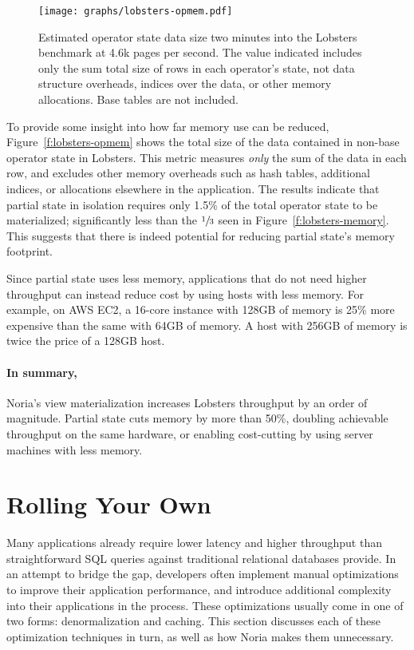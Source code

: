 \begin{figure}[h]
  \centering
  \texttt{[image: graphs/lobsters-opmem.pdf]}
  \caption{Estimated operator state data size two minutes into the Lobsters
  benchmark at 4.6k pages per second. The value indicated includes only the sum
  total size of rows in each operator's state, not data structure overheads,
  indices over the data, or other memory allocations. Base tables are not
  included.}
  \label{f:lobsters-opmem}
\end{figure}

To provide some insight into how far memory use can be reduced,
Figure~\vref{f:lobsters-opmem} shows the total size of the data contained in
non-base operator state in Lobsters. This metric measures \emph{only} the sum of
the data in each row, and excludes other memory overheads such as hash tables,
additional indices, or allocations elsewhere in the application. The results
indicate that partial state in isolation requires only 1.5\% of the total
operator state to be materialized; significantly less than the $\sfrac{1}{3}$
seen in Figure~\ref{f:lobsters-memory}. This suggests that there is indeed
potential for reducing partial state's memory footprint.

Since partial state uses less memory, applications that do not need higher
throughput can instead reduce cost by using hosts with less memory. For example,
on AWS EC2, a 16-core instance with 128GB of memory is 25\% more expensive than
the same with 64GB of memory. A host with 256GB of memory is twice the price of
a 128GB host.

\paragraph{In summary,} Noria's view materialization increases Lobsters
throughput by an order of magnitude. Partial state cuts memory by more than
50\%, doubling achievable throughput on the same hardware, or enabling
cost-cutting by using server machines with less memory.

\section{Rolling Your Own}
\label{s:eval:alts}

Many applications already require lower latency and higher throughput than
straightforward SQL queries against traditional relational databases provide.
In an attempt to bridge the gap, developers often implement manual optimizations
to improve their application performance, and introduce additional complexity
into their applications in the process. These optimizations usually come in one
of two forms: denormalization and caching. This section discusses each of these
optimization techniques in turn, as well as how Noria makes them unnecessary.

